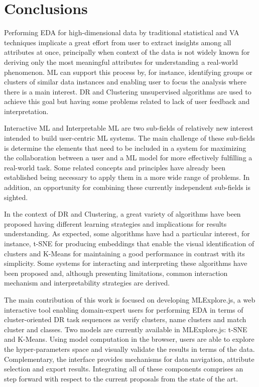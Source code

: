 
\chapter{Conclusions}
\label{chapter5}

Performing EDA for high-dimensional data by traditional statistical and VA techniques implicate a great effort from user to extract insights among all attributes at once, principally when context of the data is not widely known for deriving only the most meaningful attributes for understanding a real-world phenomenon. ML can support this process by, for instance, identifying groups or clusters of similar data instances and enabling user to focus the analysis where there is a main interest. DR and Clustering unsupervised algorithms are used to achieve this goal but having some problems related to lack of user feedback and interpretation.

Interactive ML and Interpretable ML are two sub-fields of relatively new interest intended to build user-centric ML systems. The main challenge of these sub-fields is determine the elements that need to be included in a system for maximizing the collaboration between a user and a ML model for more effectively fulfilling a real-world task. Some related concepts and principles have already been established being necessary to apply them in a more wide range of problems. In addition, an opportunity for combining these currently independent sub-fields is sighted.

In the context of DR and Clustering, a great variety of algorithms have been proposed having different learning strategies and implications for results understanding. As expected, some algorithms have had a particular interest, for instance, t-SNE for producing embeddings that enable the visual identification of clusters and K-Means for maintaining a good performance in contrast with its simplicity. Some systems for interacting and interpreting these algorithms have been proposed and, although presenting limitations, common interaction mechanism and interpretability strategies are derived.

The main contribution of this work is focused on developing MLExplore.js, a web interactive tool enabling domain-expert users for performing EDA in terms of cluster-oriented DR task sequences as verify clusters, name clusters and match cluster and classes. Two models are currently available in MLExplore.js: t-SNE and K-Means. Using model computation in the browser, users are able to explore the hyper-parameters space and visually validate the results in terms of the data. Complementary, the interface provides mechanisms for data navigation, attribute selection and export results. Integrating all of these components comprises an step forward with respect to the current proposals from the state of the art. 

